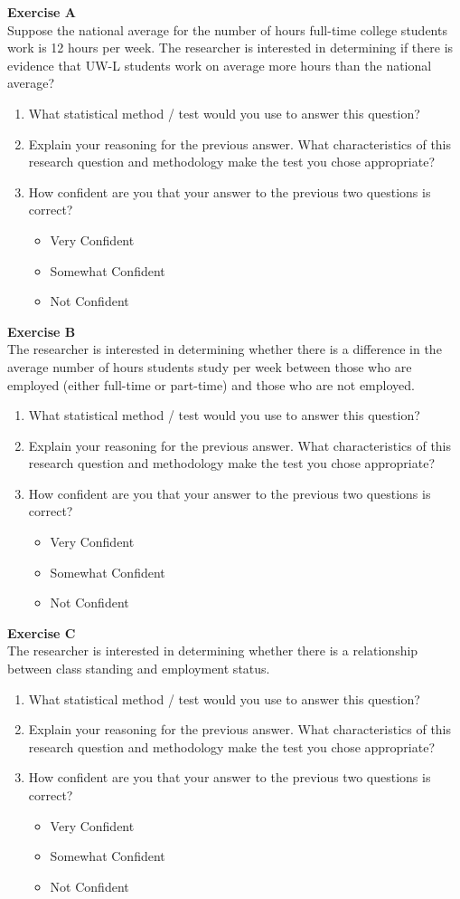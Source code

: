 \documentclass[12pt]{article}
\newcommand{\bi}{\begin{itemize}}
\newcommand{\ei}{\end{itemize}}
\newcommand{\be}{\begin{enumerate}}
\newcommand{\ee}{\end{enumerate}}
\begin{document}
\noindent \textbf{Exercise A} \\
Suppose the national average for the number of hours full-time college students work is 12 hours per week.  The researcher is interested in determining if there is evidence that UW-L students work on average more hours than the national average?
\be
\item What statistical method / test would you use to answer this question?
\item Explain your reasoning for the previous answer.  What characteristics of this research question and methodology make the test you chose appropriate?
\item How confident are you that your answer to the previous two questions is correct?  
\bi \item Very Confident \item Somewhat Confident \item Not Confident \ei
\ee

\noindent \textbf{Exercise B}\\
The researcher is interested in determining whether there is a difference in the average number of hours students study per week between those who are employed (either full-time or part-time) and those who are not employed.
\be
\item What statistical method / test would you use to answer this question?
\item Explain your reasoning for the previous answer.  What characteristics of this research question and methodology make the test you chose appropriate?
\item How confident are you that your answer to the previous two questions is correct?  
\bi \item Very Confident \item Somewhat Confident \item Not Confident \ei
\ee

\noindent \textbf{Exercise C} \\
The researcher is interested in determining whether there is a relationship between class standing and employment status.
\be
\item What statistical method / test would you use to answer this question?
\item Explain your reasoning for the previous answer.  What characteristics of this research question and methodology make the test you chose appropriate?
\item How confident are you that your answer to the previous two questions is correct?  
\bi \item Very Confident \item Somewhat Confident \item Not Confident \ei
\ee
\end{document}
